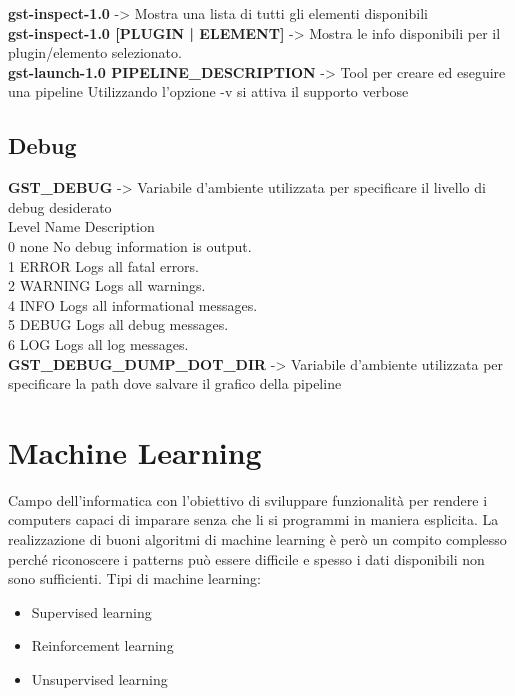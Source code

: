 \documentclass[8pt,a4paper]{article}
\begin{document}
\begin{multicols}{5}
    \textbf{gst-inspect-1.0} -> Mostra una lista di tutti gli elementi disponibili\\
    \noindent
    \textbf{gst-inspect-1.0 [PLUGIN | ELEMENT]} -> Mostra le info disponibili per il plugin/elemento selezionato.\\
    \noindent
    \textbf{gst-launch-1.0 PIPELINE\_DESCRIPTION} -> Tool per creare ed eseguire una pipeline
    Utilizzando l’opzione -v si attiva il supporto verbose\\
    
    \subsection{Debug} 
    
    \textbf{GST\_DEBUG} -> Variabile d’ambiente utilizzata per specificare il livello di debug desiderato\\
    \noindent
    Level 	Name 	Description\\
    0       none	No debug information is output.\\
    1       ERROR Logs all fatal errors.\\
    2       WARNING Logs all warnings.\\
    4       INFO 	Logs all informational messages.\\
    5       DEBUG Logs all debug messages.\\
    6       LOG   Logs all log messages.\\
    \noindent
    \textbf{GST\_DEBUG\_DUMP\_DOT\_DIR} ->  Variabile d’ambiente utilizzata per specificare la path dove salvare il grafico della pipeline
    

    \section{Machine Learning}
    Campo dell'informatica con l'obiettivo di sviluppare funzionalità per rendere
    i computers capaci di imparare senza che li si programmi in maniera esplicita.
    La realizzazione di buoni algoritmi di machine learning è però un compito complesso
    perché riconoscere i patterns può essere difficile e spesso i dati disponibili
    non sono sufficienti.
    Tipi di machine learning:
    \begin{itemize}
    \item Supervised learning
    \item Reinforcement learning
    \item Unsupervised learning
    \end{itemize}
    

\end{multicols}
\end{document}
